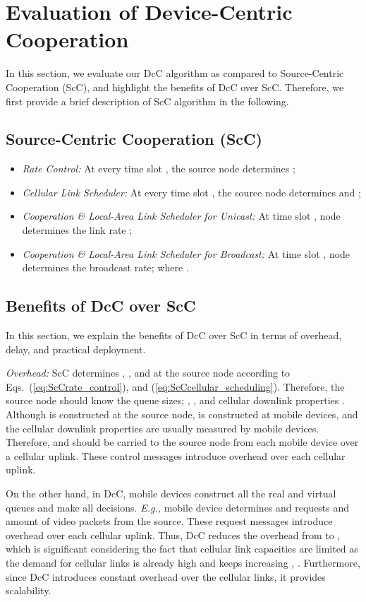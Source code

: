 \documentclass[conference]{IEEEtran}
\newcommand{\Eg}{{\em E.g., }}
\begin{document}
\section{\label{sec:DcC_vs_ScC} Evaluation of Device-Centric Cooperation}
In this section, we evaluate our DcC algorithm as compared to Source-Centric Cooperation (ScC), and highlight the benefits of DcC over ScC. Therefore, we first provide a brief description of ScC algorithm in the following.

\subsection{Source-Centric Cooperation (ScC)}
\vspace{-5pt}
\begin{itemize}
 \item {\em Rate Control:} At every time slot , the source node determines ;

 \item {\em Cellular Link Scheduler:} At every time slot , the source node determines  and ;

 \item {\em Cooperation \& Local-Area Link Scheduler for Unicast:} At time slot , node  determines the link rate ;

 \item {\em Cooperation \& Local-Area Link Scheduler for Broadcast:}
At time slot , node  determines the broadcast rate;
 where .
\end{itemize}

\subsection{Benefits of DcC over ScC}
In this section, we explain the benefits of DcC over ScC in terms of overhead, delay, and practical deployment.

{\em Overhead:} ScC determines , , and  at the source node according to Eqs.~(\ref{eq:ScCrate_control}), and (\ref{eq:ScCcellular_scheduling}). Therefore, the source node should know the queue sizes; , , and cellular downlink properties . Although  is constructed at the source node,  is constructed at mobile devices, and the cellular downlink properties  are usually measured by mobile devices. Therefore,  and  should be carried to the source node from each mobile device over a cellular uplink. These control messages introduce  overhead over each cellular uplink.

On the other hand, in DcC, mobile devices construct all the real and virtual queues and make all decisions. \Eg mobile device  determines and requests  and  amount of video packets from the source. These request messages introduce  overhead over each cellular uplink. Thus, DcC reduces the overhead from  to , which is significant considering the fact that cellular link capacities are limited as the demand for cellular links is already high and keeps increasing \cite{cisco_index}, \cite{ericsson_report}. Furthermore, since DcC introduces constant overhead over the cellular links, it provides scalability.
\end{document}

